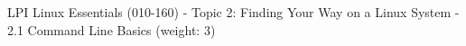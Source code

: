 LPI Linux Essentials (010-160) - Topic 2: Finding Your Way on a Linux System - 2.1 Command Line Basics (weight: 3)

